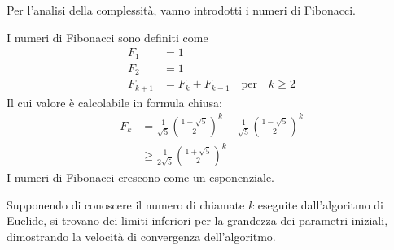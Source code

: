 Per l'analisi della complessità, vanno introdotti i numeri di Fibonacci.
\begin{definition}
    \label{def:numerifibonacci}
    I numeri di Fibonacci sono definiti come
    \begin{align*}
        F_1 &= 1
        \\
        F_2 &= 1
        \\
        F_{k+1}
        &=  
        F_{k} +
        F_{k-1}
        \quad
        \text{per}
        \quad
        k \geq 2
    \end{align*}
    Il cui valore è calcolabile in formula chiusa:
    \begin{align*}
        F_k &= 
        \frac{1}{
            \sqrt{5}
        }
        \left( 
            \frac{1 + 
                \sqrt{5}
            }{2}
        \right)^{k}
        -
        \frac{1}{
            \sqrt{5}
        }
        \left( 
            \frac{1 -
                \sqrt{5}
            }{2}
        \right)^{k}
        \\
        &
        \geq
        \frac{1}{
            2 \sqrt{5}
        }
        \left( 
            \frac{1 + 
                \sqrt{5}
            }{2}
        \right)^{k}
    \end{align*}
    I numeri di Fibonacci crescono come un esponenziale.
\end{definition}
Supponendo di conoscere il numero di chiamate $k$ eseguite dall'algoritmo di Euclide,
si trovano dei limiti inferiori per la grandezza dei parametri iniziali, dimostrando la velocità di convergenza dell'algoritmo.
